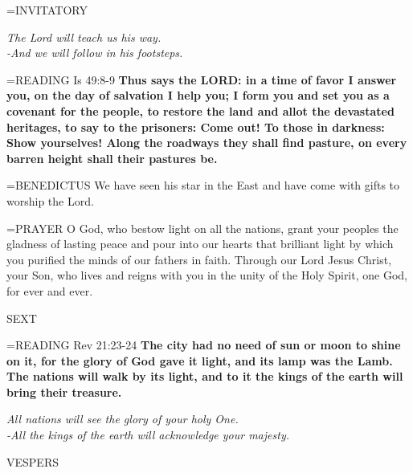 \hangindent=\parindent \small{INVITATORY}
\begin{center}
\textit{The Lord will teach us his way.\\}
\textit{-And we will follow in his footsteps.\\}
\end{center}

\hangindent=\parindent \small{\uppercase{READING}}   Is 49:8-9 \textbf{  Thus says the LORD: in a time of favor I answer you, on the day of salvation I help you; I form you and set you as a covenant for the people, to restore the land and allot the devastated heritages, to say to the prisoners: Come out! To those in darkness: Show yourselves! Along the roadways they shall find pasture, on every barren height shall their pastures be.\\}

\hangindent=\parindent \small{BENEDICTUS 	We have seen his star in the East and have come with gifts to worship the Lord.\\}

\hangindent=\parindent \small{PRAYER 	O God, who bestow light on all the nations, grant your peoples the gladness of lasting peace and pour into our hearts that brilliant light by which you purified the minds of our fathers in faith. Through our Lord Jesus Christ, your Son, who lives and reigns with you in the unity of the Holy Spirit, one God, for ever and ever.}

\begin{flushleft}\normalsize SEXT\\\end{flushleft}

\hangindent=\parindent \small{\uppercase{READING}}   Rev 21:23-24 \textbf{  The city had no need of sun or moon to shine on it, for the glory of God gave it light, and its lamp was the Lamb. The nations will walk by its light, and to it the kings of the earth will bring their treasure.\\}

\begin{center}
\textit{All nations will see the glory of your holy One.\\
-All the kings of the earth will acknowledge your majesty.}
\end{center}

\begin{flushleft}\normalsize VESPERS\\\end{flushleft}

